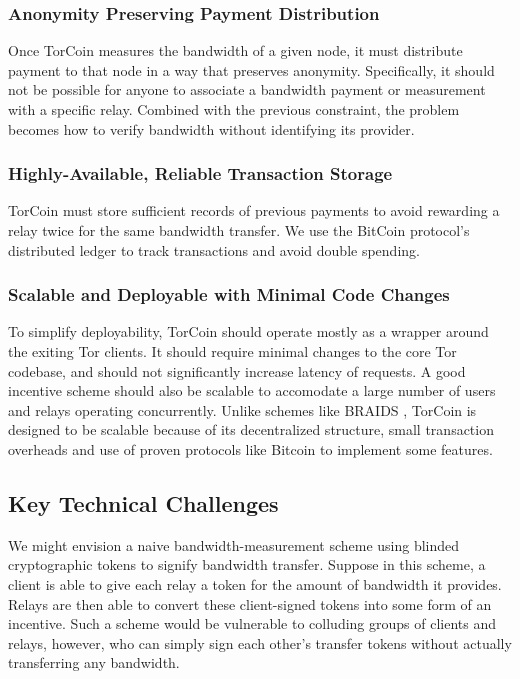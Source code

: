 \subsubsection{Anonymity Preserving Payment Distribution} Once TorCoin
measures the bandwidth of a given node, it must distribute payment to that
node in a way that preserves anonymity. Specifically, it should not be
possible for anyone to associate a bandwidth payment or measurement with a
specific relay. Combined with the previous constraint, the problem becomes how
to verify bandwidth without identifying its provider.

\subsubsection{Highly-Available, Reliable Transaction Storage} TorCoin must
store sufficient records of previous payments to avoid rewarding a relay twice
for the same bandwidth transfer. We use the BitCoin protocol's distributed
ledger  to track transactions and avoid double spending.

\subsubsection{Scalable and Deployable with Minimal Code Changes} To simplify
deployability, TorCoin should operate mostly as a wrapper around the exiting
Tor clients. It should require minimal changes to the core Tor codebase, and
should not significantly increase latency of requests. A good incentive scheme
should also be scalable to accomodate a large number of users and relays
operating concurrently. Unlike schemes like BRAIDS \cite{ccs10-braids},
TorCoin is designed to be scalable because of its decentralized structure,
small transaction overheads and use of proven protocols  like Bitcoin to
implement some features.

\subsection{Key Technical Challenges}

We might envision a naive bandwidth-measurement
scheme using blinded cryptographic tokens to signify bandwidth
transfer. Suppose in this scheme, a client is able to give each relay a token
for the amount of bandwidth it provides. Relays are then able to convert these
client-signed tokens into some form of an incentive. 
Such a scheme would be vulnerable
to colluding groups of clients and relays, however,
who can simply sign each other's
transfer tokens without actually transferring any bandwidth.

